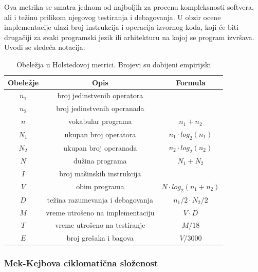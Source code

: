 \documentclass[a4paper]{article}
\begin{document}
Ova metrika se smatra jednom od najboljih za procenu kompleksnosti softvera, ali i težinu prilikom njegovog testiranja i debagovanja. U obzir ocene implementacije ulazi broj instrukcija i operacija izvornog koda, koji će biti drugačiji za svaki programski jezik ili arhitekturu na kojoj se program izvršava. Uvodi se sledeća notacija:\\

\begin{table}[h]
\centering
 \begin{tabular}{|c|c|c|}
  \hline
  Obeležje & Opis & Formula \\ [0ex] 
  \hline
  $n_1$ & broj jedinstvenih operatora & \\ 
  \hline
  $n_2$ & broj jedinstvenih operanada & \\ 
  \hline
  $n$ & vokabular programa & $ n_1 + n_2 $ \\ 
  \hline
  $N_1$ & ukupan broj operatora & $ n_1 \cdot log_2(n_1) $ \\ 
  \hline
  $N_2$ & ukupan broj operanada & $ n_2 \cdot log_2(n_2) $ \\ 
  \hline
  $N$ & dužina programa & $ N_1 + N_2 $ \\
  \hline
  $I$ & broj mašinskih instrukcija & \\
  \hline
  $V$ & obim programa & $ N \cdot log_2(n_1+n_2) $ \\
  \hline
  $D$ & težina razumevanja i debagovanja & $ n_1/2 \cdot N_2 / 2  $ \\
  \hline
  $M$ & vreme utrošeno na implementaciju & $ V \cdot D $ \\
  \hline
  $T$ & vreme utrošeno na testiranje & $ M / 18 $ \\
  \hline
  $E$ & broj grešaka i bagova & $ V / 3000 $ \\
  \hline
 \end{tabular}
 \caption{Obeležja u Holstedovoj metrici. Brojevi su dobijeni empirijski \cite{ibm_halstead}}
 \label{tabela:1} 
\end{table}

\subsubsection{Mek-Kejbova ciklomatična složenost}
\label{subsec:mekkejb}
\end{document}
